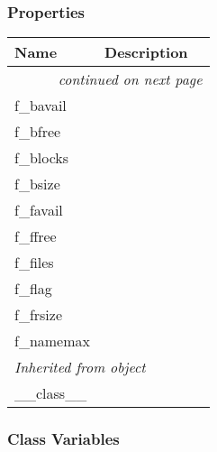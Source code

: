 
  \subsubsection{Properties}

    \vspace{-1cm}
\hspace{\varindent}\begin{longtable}{|p{\varnamewidth}|p{\vardescrwidth}|l}
\cline{1-2}
\cline{1-2} \centering \textbf{Name} & \centering \textbf{Description}& \\
\cline{1-2}
\endhead\cline{1-2}\multicolumn{3}{r}{\small\textit{continued on next page}}\\\endfoot\cline{1-2}
\endlastfoot\raggedright f\-\_\-b\-a\-v\-a\-i\-l\- & &\\
\cline{1-2}
\raggedright f\-\_\-b\-f\-r\-e\-e\- & &\\
\cline{1-2}
\raggedright f\-\_\-b\-l\-o\-c\-k\-s\- & &\\
\cline{1-2}
\raggedright f\-\_\-b\-s\-i\-z\-e\- & &\\
\cline{1-2}
\raggedright f\-\_\-f\-a\-v\-a\-i\-l\- & &\\
\cline{1-2}
\raggedright f\-\_\-f\-f\-r\-e\-e\- & &\\
\cline{1-2}
\raggedright f\-\_\-f\-i\-l\-e\-s\- & &\\
\cline{1-2}
\raggedright f\-\_\-f\-l\-a\-g\- & &\\
\cline{1-2}
\raggedright f\-\_\-f\-r\-s\-i\-z\-e\- & &\\
\cline{1-2}
\raggedright f\-\_\-n\-a\-m\-e\-m\-a\-x\- & &\\
\cline{1-2}
\multicolumn{2}{|l|}{\textit{Inherited from object}}\\
\multicolumn{2}{|p{\varwidth}|}{\raggedright \_\_class\_\_}\\
\cline{1-2}
\end{longtable}



  \subsubsection{Class Variables}

